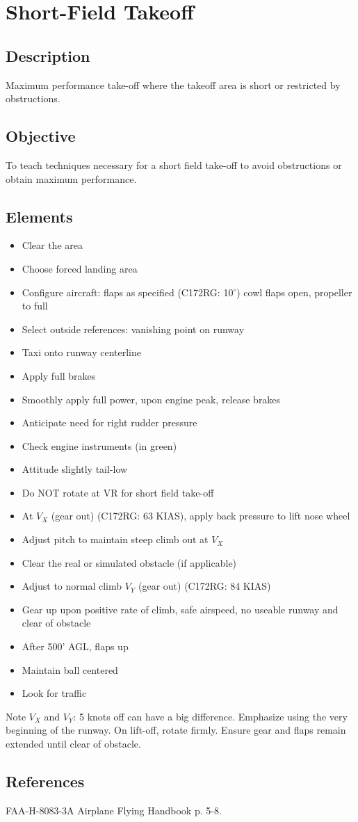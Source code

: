 \section{Short-Field Takeoff}

\subsection{Description}

Maximum performance take-off where the takeoff area is short or restricted by
obstructions.

\subsection{Objective}

To teach techniques necessary for a short field take-off to avoid obstructions
or obtain maximum performance.

\subsection{Elements}

\begin{itemize}
  \item Clear the area
  \item Choose forced landing area
  \item Configure aircraft: flaps as specified (C172RG: 10$^\circ$) cowl flaps
    open, propeller to full
  \item Select outside references: vanishing point on runway
  \item Taxi onto runway centerline
  \item Apply full brakes
  \item Smoothly apply full power, upon engine peak, release brakes
  \item Anticipate need for right rudder pressure
  \item Check engine instruments (in green)
  \item Attitude slightly tail-low
  \item Do NOT rotate at VR for short field take-off
  \item At $V_X$ (gear out) (C172RG: 63 KIAS), apply back pressure to lift nose
    wheel
  \item Adjust pitch to maintain steep climb out at $V_X$
  \item Clear the real or simulated obstacle (if applicable)
  \item Adjust to normal climb $V_Y$ (gear out) (C172RG: 84 KIAS)
  \item Gear up upon positive rate of climb, safe airspeed, no useable runway
    and clear of obstacle
  \item After 500' AGL, flaps up
  \item Maintain ball centered 
  \item Look for traffic
\end{itemize}

Note $V_X$ and $V_Y$: 5 knots off can have a big difference. Emphasize using
the very beginning of the runway. On lift-off, rotate firmly. Ensure gear and
flaps remain extended until clear of obstacle.

\subsection{References}

FAA-H-8083-3A Airplane Flying Handbook p. 5-8.

